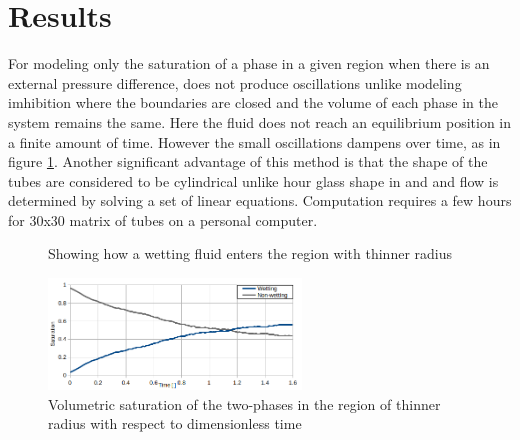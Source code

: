 \documentclass[11pt]{article}
\begin{document}
	\section*{Results}
		For modeling only the saturation of a phase in a given region \cite{bib5} when there is an external pressure difference, does not produce oscillations unlike modeling imhibition where the boundaries are closed and the volume of each phase in the system remains the same. Here the fluid does not reach an equilibrium position in a finite amount of time. However the small oscillations dampens over time, as in figure \ref{fig:sat-vs-time}. Another significant advantage of this method is that the shape of the tubes are considered to be cylindrical unlike hour glass shape in \cite{bib3} and and flow is determined by solving a set of linear equations. Computation requires a few hours for 30x30 matrix of tubes on a personal computer.
		\begin{figure}[H]
			\centering
			\caption{Showing how a wetting fluid enters the region with thinner radius}
		\end{figure}
		\begin{figure}[H]
			\centering
			\includegraphics[width=0.6\textwidth]{plot-sat-vs-time}
			\caption{Volumetric saturation of the two-phases in the region of thinner radius with respect to dimensionless time}
			\label{fig:sat-vs-time}
		\end{figure}
	
\end{document}
